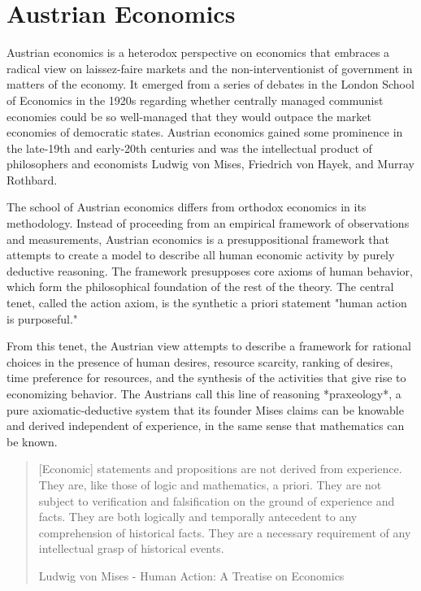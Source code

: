
\section{Austrian Economics}

Austrian economics is a heterodox perspective on economics that embraces a
radical view on laissez-faire markets and the non-interventionist of government
in matters of the economy. It emerged from a series of debates in the London
School of Economics in the 1920s regarding whether centrally managed communist
economies could be so well-managed that they would outpace the market economies
of democratic states. Austrian economics gained some prominence in the late-19th
and early-20th centuries and was the intellectual product of philosophers and
economists Ludwig von Mises, Friedrich von Hayek, and Murray Rothbard.


The school of Austrian economics differs from orthodox economics in its
methodology. Instead of proceeding from an empirical framework of observations
and measurements, Austrian economics is a presuppositional framework that
attempts to create a model to describe all human economic activity by purely
deductive reasoning. The framework presupposes core axioms of human behavior,
which form the philosophical foundation of the rest of the theory. The central
tenet, called the action axiom, is the synthetic a priori statement "human
action is purposeful."

From this tenet, the Austrian view attempts to describe a framework for rational
choices in the presence of human desires, resource scarcity, ranking of desires,
time preference for resources, and the synthesis of the activities that give
rise to economizing behavior. The Austrians call this line of reasoning
*praxeology*, a pure axiomatic-deductive system that its founder Mises claims
can be knowable and derived independent of experience, in the same sense that
mathematics can be known.


\begin{quote}
{[}Economic{]} statements and propositions are not derived from
experience. They are, like those of logic and mathematics, a priori.
They are not subject to verification and falsification on the ground of
experience and facts. They are both logically and temporally antecedent
to any comprehension of historical facts. They are a necessary
requirement of any intellectual grasp of historical events.

\begin{flushright}
Ludwig von Mises - Human Action: A Treatise on Economics
\end{flushright}
\end{quote}


